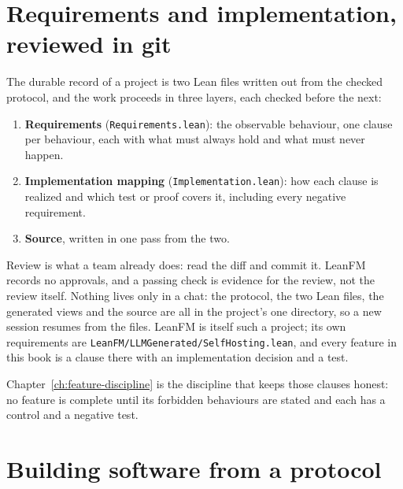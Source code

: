 \section{Requirements and implementation, reviewed in git}

The durable record of a project is two Lean files written out from the checked
protocol, and the work proceeds in three layers, each checked before the next:

\begin{enumerate}
  \item \textbf{Requirements} (\texttt{Requirements.lean}): the observable
        behaviour, one clause per behaviour, each with what must always hold and
        what must never happen.
  \item \textbf{Implementation mapping} (\texttt{Implementation.lean}): how each
        clause is realized and which test or proof covers it, including every
        negative requirement.
  \item \textbf{Source}, written in one pass from the two.
\end{enumerate}

Review is what a team already does: read the diff and commit it. LeanFM records no
approvals, and a passing check is evidence for the review, not the review itself.
Nothing lives only in a chat: the protocol, the two Lean files, the generated
views and the source are all in the project's one directory, so a new session
resumes from the files. LeanFM is itself such a project; its own requirements are
\texttt{LeanFM/LLMGenerated/SelfHosting.lean}, and every feature in this book is a
clause there with an implementation decision and a test.

Chapter~\ref{ch:feature-discipline} is the discipline that keeps those clauses
honest: no feature is complete until its forbidden behaviours are stated and each
has a control and a negative test.

\section{Building software from a protocol}

